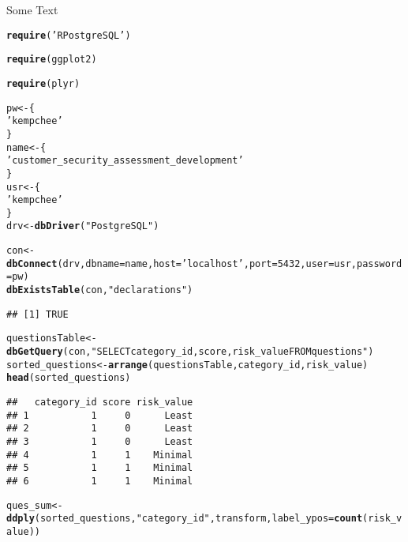 \documentclass{article}\usepackage[]{graphicx}\usepackage[]{color}
\makeatletter
\newcommand{\hlnum}[1]{\textcolor[rgb]{0.686,0.059,0.569}{#1}}%
\newcommand{\hlstr}[1]{\textcolor[rgb]{0.192,0.494,0.8}{#1}}%
\newcommand{\hlstd}[1]{\textcolor[rgb]{0.345,0.345,0.345}{#1}}%
\newcommand{\hlkwb}[1]{\textcolor[rgb]{0.69,0.353,0.396}{#1}}%
\newcommand{\hlkwc}[1]{\textcolor[rgb]{0.333,0.667,0.333}{#1}}%
\newcommand{\hlkwd}[1]{\textcolor[rgb]{0.737,0.353,0.396}{\textbf{#1}}}%
\newenvironment{kframe}{%
 \def\at@end@of@kframe{}%
 \ifinner\ifhmode%
  \def\at@end@of@kframe{\end{minipage}}%
  \begin{minipage}{\columnwidth}%
 \fi\fi%
 \def\FrameCommand##1{\hskip\@totalleftmargin \hskip-\fboxsep
 \colorbox{shadecolor}{##1}\hskip-\fboxsep
     \hskip-\linewidth \hskip-\@totalleftmargin \hskip\columnwidth}%
 \MakeFramed {\advance\hsize-\width
   \@totalleftmargin\z@ \linewidth\hsize
   \@setminipage}}%
 {\par\unskip\endMakeFramed%
 \at@end@of@kframe}
\newenvironment{knitrout}{}{} %
\makeatother
\begin{document}
Some Text
\begin{knitrout}
\color{fgcolor}\begin{kframe}
\begin{alltt}
\hlkwd{require}\hlstd{(}\hlstr{'RPostgreSQL'}\hlstd{)}
\end{alltt}


{\ttfamily\noindent\itshape\color{messagecolor}{\#\# Loading required package: RPostgreSQL}}

{\ttfamily\noindent\itshape\color{messagecolor}{\#\# Loading required package: DBI}}\begin{alltt}
\hlkwd{require}\hlstd{(ggplot2)}
\end{alltt}


{\ttfamily\noindent\itshape\color{messagecolor}{\#\# Loading required package: ggplot2}}\begin{alltt}
\hlkwd{require}\hlstd{(plyr)}
\end{alltt}


{\ttfamily\noindent\itshape\color{messagecolor}{\#\# Loading required package: plyr}}\begin{alltt}
\hlstd{pw} \hlkwb{<-} \hlstd{\{}
  \hlstr{'kempchee'}
\hlstd{\}}
\hlstd{name} \hlkwb{<-} \hlstd{\{}
 \hlstr{'customer_security_assessment_development'}
\hlstd{\}}
\hlstd{usr} \hlkwb{<-}\hlstd{\{}
  \hlstr{'kempchee'}
\hlstd{\}}
\hlstd{drv} \hlkwb{<-} \hlkwd{dbDriver}\hlstd{(}\hlstr{"PostgreSQL"}\hlstd{)}

\hlstd{con} \hlkwb{<-}\hlkwd{dbConnect}\hlstd{(drv,} \hlkwc{dbname} \hlstd{= name,} \hlkwc{host} \hlstd{=} \hlstr{'localhost'}\hlstd{,} \hlkwc{port} \hlstd{=} \hlnum{5432}\hlstd{,} \hlkwc{user}\hlstd{= usr,} \hlkwc{password} \hlstd{= pw)}
\hlkwd{dbExistsTable}\hlstd{(con,} \hlstr{"declarations"}\hlstd{)}
\end{alltt}
\begin{verbatim}
## [1] TRUE
\end{verbatim}
\begin{alltt}
\hlstd{questionsTable} \hlkwb{<-} \hlkwd{dbGetQuery}\hlstd{(con,} \hlstr{"SELECT category_id, score, risk_value FROM questions"}\hlstd{)}
\hlstd{sorted_questions} \hlkwb{<-} \hlkwd{arrange}\hlstd{(questionsTable, category_id, risk_value)}
\hlkwd{head}\hlstd{(sorted_questions)}
\end{alltt}
\begin{verbatim}
##   category_id score risk_value
## 1           1     0      Least
## 2           1     0      Least
## 3           1     0      Least
## 4           1     1    Minimal
## 5           1     1    Minimal
## 6           1     1    Minimal
\end{verbatim}
\begin{alltt}
\hlstd{ques_sum} \hlkwb{<-} \hlkwd{ddply}\hlstd{(sorted_questions,} \hlstr{"category_id"}\hlstd{, transform,} \hlkwc{label_ypos}\hlstd{=}\hlkwd{count}\hlstd{(risk_value))}
\end{alltt}



\end{kframe}
\end{knitrout}
\end{document}
